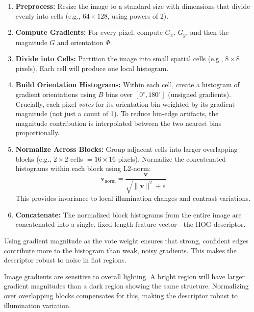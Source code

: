 \begin{enumerate}
    \item \textbf{Preprocess:} Resize the image to a standard size with dimensions that divide evenly into cells (e.g., $64 \times 128$, using powers of 2).

    \item \textbf{Compute Gradients:} For every pixel, compute $G_x$, $G_y$, and then the magnitude $G$ and orientation $\Phi$.

    \item \textbf{Divide into Cells:} Partition the image into small spatial cells (e.g., $8 \times 8$ pixels). Each cell will produce one local histogram.

    \item \textbf{Build Orientation Histograms:} Within each cell, create a histogram of gradient orientations using $B$ bins over $[0^\circ, 180^\circ]$ (unsigned gradients). Crucially, each pixel \textit{votes} for its orientation bin weighted by its gradient magnitude (not just a count of 1). To reduce bin-edge artifacts, the magnitude contribution is interpolated between the two nearest bins proportionally.

    \item \textbf{Normalize Across Blocks:} Group adjacent cells into larger overlapping blocks (e.g., $2 \times 2$ cells $= 16 \times 16$ pixels). Normalize the concatenated histograms within each block using L2-norm:
    $$ \mathbf{v}_{\text{norm}} = \frac{\mathbf{v}}{\sqrt{\|\mathbf{v}\|^2 + \epsilon}} $$
    This provides invariance to local illumination changes and contrast variations.

    \item \textbf{Concatenate:} The normalized block histograms from the entire image are concatenated into a single, fixed-length feature vector---the HOG descriptor.
\end{enumerate}

\begin{remark}
Using gradient magnitude as the vote weight ensures that strong, confident edges contribute more to the histogram than weak, noisy gradients. This makes the descriptor robust to noise in flat regions.
\end{remark}

\begin{remark}
Image gradients are sensitive to overall lighting. A bright region will have larger gradient magnitudes than a dark region showing the same structure. Normalizing over overlapping blocks compensates for this, making the descriptor robust to illumination variation.
\end{remark}

